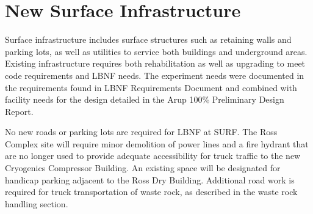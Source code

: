 \section{New Surface Infrastructure}
\label{sec:fscf-surf-facil-surface-new}

Surface infrastructure includes surface structures such as retaining walls and parking lots, as well as utilities to service both buildings and underground areas. Existing infrastructure requires both rehabilitation as well as upgrading to meet code requirements and LBNF needs. The experiment needs were documented in the requirements found in LBNF Requirements Document\cite{dune-sci-req} and combined with facility needs for the design detailed in the Arup 100\% Preliminary Design Report\cite{arup:fscf100pdr}.

No new roads or parking lots are required for LBNF at SURF. The Ross Complex site will require minor demolition of power lines and a fire hydrant that are no longer used to provide adequate accessibility for truck traffic to the new Cryogenics Compressor Building. An existing space will be designated for handicap parking adjacent to the Ross Dry Building. Additional road work is required for truck transportation of waste rock, as described in the waste rock handling section.



